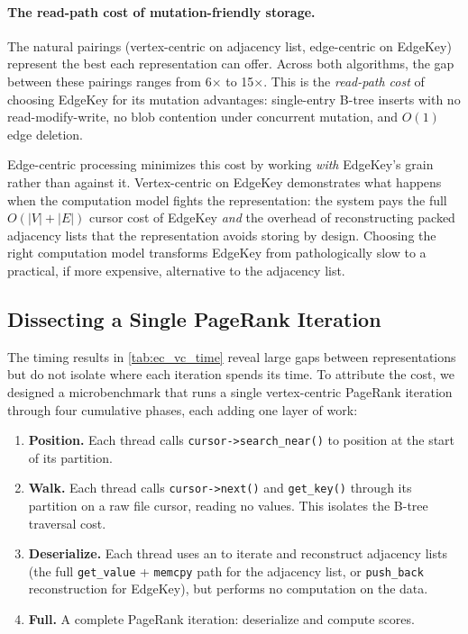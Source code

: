 \paragraph{The read-path cost of mutation-friendly storage.}
The natural pairings (vertex-centric on adjacency list, edge-centric on EdgeKey) represent the best each representation can offer.
Across both algorithms, the gap between these pairings ranges from 6$\times$ to 15$\times$.
This is the \emph{read-path cost} of choosing EdgeKey for its mutation advantages: single-entry B-tree inserts with no read-modify-write, no blob contention under concurrent mutation, and $O(1)$ edge deletion.

Edge-centric processing minimizes this cost by working \emph{with} EdgeKey's grain rather than against it.
Vertex-centric on EdgeKey demonstrates what happens when the computation model fights the representation: the system pays the full $O(|V| + |E|)$ cursor cost of EdgeKey \emph{and} the overhead of reconstructing packed adjacency lists that the representation avoids storing by design.
Choosing the right computation model transforms EdgeKey from pathologically slow to a practical, if more expensive, alternative to the adjacency list.

\subsection{Dissecting a Single PageRank Iteration}
\label{sec:eval:pr_breakdown}

The timing results in \autoref{tab:ec_vc_time} reveal large gaps between representations but do not isolate where each iteration spends its time.
To attribute the cost, we designed a microbenchmark that runs a single vertex-centric PageRank iteration through four cumulative phases, each adding one layer of work:

\begin{enumerate}
  \item \textbf{Position.} Each thread calls \texttt{cursor->search\_near()} to position at the start of its partition.
  \item \textbf{Walk.} Each thread calls \texttt{cursor->next()} and \texttt{get\_key()} through its partition on a raw \wt{} file cursor, reading no values. This isolates the B-tree traversal cost.
  \item \textbf{Deserialize.} Each thread uses an  to iterate and reconstruct adjacency lists (the full \texttt{get\_value} + \texttt{memcpy} path for the adjacency list, or \texttt{push\_back} reconstruction for EdgeKey), but performs no computation on the data.
  \item \textbf{Full.} A complete PageRank iteration: deserialize and compute scores.
\end{enumerate}

